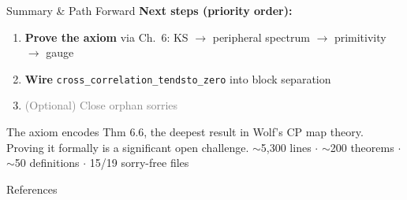 \documentclass[aspectratio=169,10pt]{beamer}
\begin{document}
\begin{frame}{Summary \& Path Forward}
    \vspace{0.0em}
    {\small\textbf{Next steps (priority order):}}
    \begin{enumerate}\itemsep0em\footnotesize
        \item \textcolor{softred}{\textbf{Prove the axiom}} via \cite{Wolf2012Quantum} Ch.~6:
            KS $\to$ peripheral spectrum $\to$ primitivity $\to$ gauge
        \item \textcolor{softred}{\textbf{Wire}} \texttt{cross\_correlation\_tendsto\_zero}
            into block separation
        \item \textcolor{gray}{(Optional) Close orphan sorries}
    \end{enumerate}

    \vspace{-0.1em}
    {\tiny The axiom encodes \cite{Wolf2012Quantum} Thm 6.6, the deepest result
    in Wolf's CP map theory. Proving it formally is a significant open challenge.
    \quad ${\sim}$5{,}300 lines $\cdot$ ${\sim}$200 theorems $\cdot$ ${\sim}$50 definitions $\cdot$ 15/19 sorry-free files}
\end{frame}

\begin{frame}[allowframebreaks]{References}
\footnotesize

\end{frame}
\end{document}
